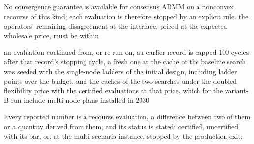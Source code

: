     No convergence guarantee is available for consensus ADMM on a nonconvex recourse of this kind; each evaluation is therefore stopped by an explicit rule.
    the operators' remaining disagreement at the interface, priced at the expected wholesale price, must be within

\label{subsec:case_investment_costs}

    an evaluation continued from, or re-run on, an earlier record is capped 100 cycles after that record's stopping cycle, a fresh one at
    the cache of the baseline search was seeded with the single-node ladders of the initial design, including ladder points over the budget, and the caches of the two searches under the doubled flexibility price with the certified evaluations at that price, which for the variant-B run include multi-node plans installed in 2030

    Every reported number is a recourse evaluation, a difference between two of them or a quantity derived from them, and its status is stated: certified, uncertified with its bar, or, at the multi-scenario instance, stopped by the production exit;

